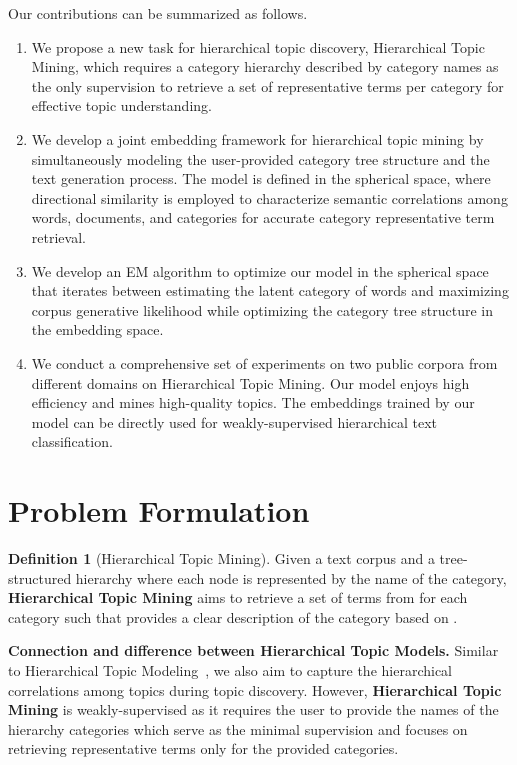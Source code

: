 \documentclass[sigconf]{acmart}
\theoremstyle{definition}
\newtheorem{definition}{Definition}
\begin{document}
Our contributions can be summarized as follows.
\begin{enumerate}
\item We propose a new task for hierarchical topic discovery, Hierarchical Topic Mining, which requires a category hierarchy described by category names as the only supervision to retrieve a set of representative terms per category for effective topic understanding.


\item We develop a joint embedding framework for hierarchical topic mining by simultaneously modeling the user-provided category tree structure and the text generation process. The model is defined in the spherical space, where directional similarity is employed to characterize semantic correlations among words, documents, and categories for accurate category representative term retrieval. 


\item We develop an EM algorithm to optimize our model in the spherical space that iterates between estimating the latent category of words and maximizing corpus generative likelihood while optimizing the category tree structure in the embedding space.

\item We conduct a comprehensive set of experiments on two public corpora from different domains on Hierarchical Topic Mining. Our model enjoys high efficiency and mines high-quality topics. The embeddings trained by our model can be directly used for weakly-supervised hierarchical text classification.

\end{enumerate} 


\section{Problem Formulation}
\begin{definition} [Hierarchical Topic Mining]
Given a text corpus  and a tree-structured
hierarchy  where each node  is represented by the name of the category, \textbf{Hierarchical Topic Mining} aims to retrieve a set of terms  from  for each category  such that  provides a clear description of the category  based on .
\end{definition}

\noindent 
\textbf{Connection and difference between Hierarchical Topic Models.} Similar to Hierarchical Topic Modeling~\cite{Blei2003HierarchicalTM}, we also aim to capture the hierarchical correlations among topics during topic discovery. However, \textbf{Hierarchical Topic Mining} is weakly-supervised as it requires the user to provide the names of the hierarchy categories which serve as the minimal supervision and focuses on retrieving representative terms only for the provided categories.
\end{document}
